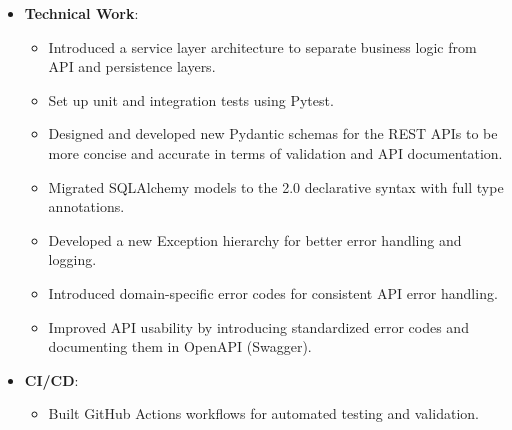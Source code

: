 \documentclass[10pt, dvipsnames, svgnames, x11names]{article}
\begin{document}
\begin{itemize}[nosep]
\begin{itemize}[nosep]
\item 
Developed an event-driven service for email and SMS delivery.

\item 
Implemented an image processing service for compression, resizing, cropping, and video thumbnail generation.

\item Reduced image size by 50\% to 90\%.

\item 
Built a real-time chat service enabling communication between trainers and trainees.
\end{itemize}

\item \textbf{Technical Work}:
\begin{itemize}[nosep]
\item 
Introduced a service layer architecture to separate business logic from API and persistence layers.

\item 
Set up unit and integration tests using Pytest.

\item 
Designed and developed new Pydantic schemas for the REST APIs to be more concise and accurate in terms of validation and API documentation.

\item 
Migrated SQLAlchemy models to the 2.0 declarative syntax with full type annotations.

\item 
Developed a new Exception hierarchy for better error handling and logging.

\item 
Introduced domain-specific error codes for consistent API error handling.

\item Improved API usability by introducing standardized error codes and documenting them in OpenAPI (Swagger).
\end{itemize}

\item \textbf{CI/CD}:
\begin{itemize}[nosep]
\item Built GitHub Actions workflows for automated testing and validation.
\end{itemize}
\end{itemize}
\end{document}

